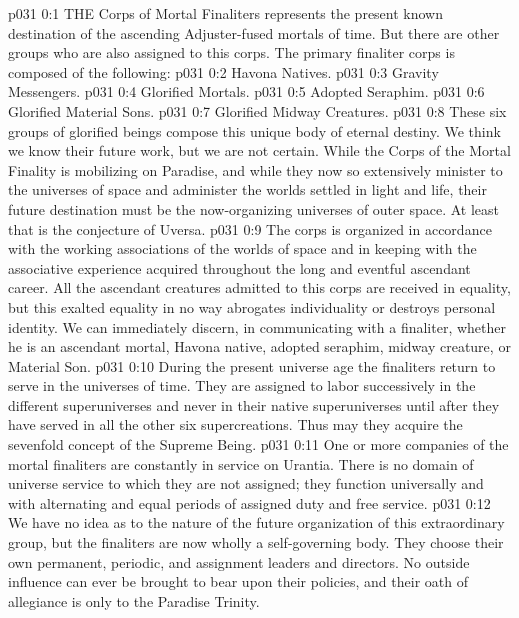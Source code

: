 \vs p031 0:1 THE Corps of Mortal Finaliters represents the present known destination of the ascending Adjuster\hyp{}fused mortals of time. But there are other groups who are also assigned to this corps. The primary finaliter corps is composed of the following:
\vs p031 0:2 \bibnobreakspace Havona Natives.
\vs p031 0:3 \bibnobreakspace Gravity Messengers.
\vs p031 0:4 \bibnobreakspace Glorified Mortals.
\vs p031 0:5 \bibnobreakspace Adopted Seraphim.
\vs p031 0:6 \bibnobreakspace Glorified Material Sons.
\vs p031 0:7 \bibnobreakspace Glorified Midway Creatures.
\vs p031 0:8 \pc These six groups of glorified beings compose this unique body of eternal destiny. We think we know their future work, but we are not certain. While the Corps of the Mortal Finality is mobilizing on Paradise, and while they now so extensively minister to the universes of space and administer the worlds settled in light and life, their future destination must be the now\hyp{}organizing universes of outer space. At least that is the conjecture of Uversa.
\vs p031 0:9 The corps is organized in accordance with the working associations of the worlds of space and in keeping with the associative experience acquired throughout the long and eventful ascendant career. All the ascendant creatures admitted to this corps are received in equality, but this exalted equality in no way abrogates individuality or destroys personal identity. We can immediately discern, in communicating with a finaliter, whether he is an ascendant mortal, Havona native, adopted seraphim, midway creature, or Material Son.
\vs p031 0:10 During the present universe age the finaliters return to serve in the universes of time. They are assigned to labor successively in the different superuniverses and never in their native superuniverses until after they have served in all the other six supercreations. Thus may they acquire the sevenfold concept of the Supreme Being.
\vs p031 0:11 One or more companies of the mortal finaliters are constantly in service on Urantia. There is no domain of universe service to which they are not assigned; they function universally and with alternating and equal periods of assigned duty and free service.
\vs p031 0:12 We have no idea as to the nature of the future organization of this extraordinary group, but the finaliters are now wholly a self\hyp{}governing body. They choose their own permanent, periodic, and assignment leaders and directors. No outside influence can ever be brought to bear upon their policies, and their oath of allegiance is only to the Paradise Trinity.
